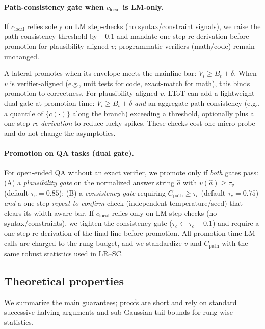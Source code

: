 \documentclass{article}
\begin{document}
\paragraph{Path-consistency gate when $c_{\text{local}}$ is LM-only.}
If $c_{\text{local}}$ relies solely on LM step-checks (no syntax/constraint signals), we raise the path-consistency threshold by $+0.1$
and mandate one-step re-derivation before promotion for plausibility-aligned $v$; programmatic verifiers (math/code) remain unchanged.


A lateral promotes when its envelope meets the mainline bar: $V_i \ge B_t+\delta$.
When $v$ is verifier-aligned (e.g., unit tests for code, exact-match for math), this binds promotion to correctness.
For plausibility-aligned $v$, LToT can add a lightweight dual gate at promotion time:
$V_i\!\ge\!B_t{+}\delta$ \emph{and} an aggregate path-consistency (e.g., a quantile of $\{c(\cdot)\}$ along the branch) exceeding a threshold, optionally plus a one-step \emph{re-derivation} to reduce lucky spikes.
These checks cost one micro-probe and do not change the asymptotics.

\vspace{0.5em}
\paragraph{Promotion on QA tasks (dual gate).}
For open-ended QA without an exact verifier, we promote only if \emph{both} gates pass:
(A) a \emph{plausibility gate} on the normalized answer string $\hat a$ with $v(\hat a)\ge \tau_v$ (default $\tau_v{=}0.85$);
(B) a \emph{consistency gate} requiring $C_{\text{path}}\ge \tau_c$ (default $\tau_c{=}0.75$) \emph{and} a one-step \emph{repeat-to-confirm} check (independent temperature/seed) that clears its width-aware bar.
If $c_{\text{local}}$ relies only on LM step-checks (no syntax/constraints), we tighten the consistency gate ($\tau_c\leftarrow\tau_c{+}0.1$) and require a one-step re-derivation of the final line before promotion.
All promotion-time LM calls are charged to the rung budget, and we standardize $v$ and $C_{\text{path}}$ with the same robust statistics used in LR--SC.

\subsection{Theoretical properties}
\label{sec:theory}

We summarize the main guarantees; proofs are short and rely on standard successive-halving arguments and sub-Gaussian tail bounds for rung-wise statistics.
\end{document}

